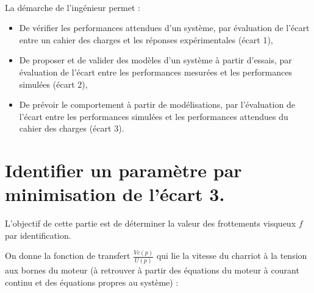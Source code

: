 

 \\

\graphicspath{{../../../img/}}
\begin{center}
\def\svgwidth{\columnwidth}

\end{center}

La démarche de l’ingénieur permet :
\begin{itemize}
 \item De vérifier les performances attendues d’un système, par évaluation de l’écart entre un cahier des charges et les réponses expérimentales (écart 1),
 \item De proposer et de valider des modèles d’un système à partir d’essais, par évaluation de l’écart entre les performances mesurées et les performances simulées (écart 2),
 \item De prévoir le comportement à partir de modélisations, par l’évaluation de l’écart entre les performances simulées et les performances attendues du cahier des charges (écart 3).
\end{itemize}

\newpage

\newpage

\section{Identifier un paramètre par minimisation de l'écart 3.}

L'objectif de cette partie est de déterminer la valeur des frottements visqueux $f$ par identification.

On donne la fonction de transfert $\frac{Vc(p)}{U(p)}$ qui lie la vitesse du charriot à la tension aux bornes du moteur (à retrouver à partir des équations du moteur à courant continu et des équations propres au système) :

